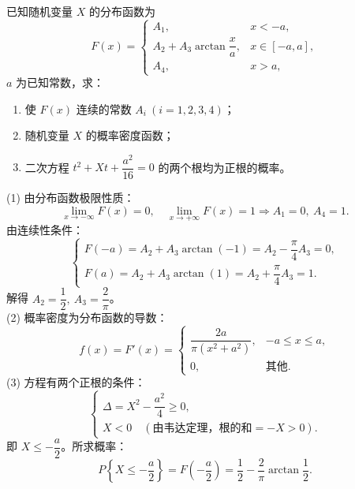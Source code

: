 \documentclass[lang=cn,11pt]{elegantbook}
\begin{document}
\begin{exercise}[反正切分布函数]
已知随机变量 $X$ 的分布函数为
\[
F(x)=
\begin{cases}
A_1, & x<-a, \\[4pt]
A_2+A_3\arctan\dfrac{x}{a}, & x\in[-a,a], \\[6pt]
A_4, & x>a,
\end{cases}
\]
$a$ 为已知常数，求：
\begin{enumerate}
    \item[(1)] 使 $F(x)$ 连续的常数 $A_i\ (i=1,2,3,4)$；
    \item[(2)] 随机变量 $X$ 的概率密度函数；
    \item[(3)] 二次方程 $t^2+Xt+\dfrac{a^2}{16}=0$ 的两个根均为正根的概率。
\end{enumerate}
\end{exercise}
\begin{solution}
(1) 由分布函数极限性质：
\[
\lim_{x\to-\infty}F(x)=0,\quad \lim_{x\to+\infty}F(x)=1 \Rightarrow A_1=0,\ A_4=1.
\]
由连续性条件：
\[
\begin{cases}
F(-a)=A_2+A_3\arctan(-1)=A_2-\dfrac{\pi}{4}A_3=0, \\[6pt]
F(a)=A_2+A_3\arctan(1)=A_2+\dfrac{\pi}{4}A_3=1.
\end{cases}
\]
解得 $A_2=\dfrac{1}{2},\ A_3=\dfrac{2}{\pi}$。\\
(2) 概率密度为分布函数的导数：
\[
f(x)=F'(x)=
\begin{cases}
\dfrac{2a}{\pi(x^2+a^2)}, & -a\leqslant x\leqslant a, \\[6pt]
0, & \text{其他}.
\end{cases}
\]
(3) 方程有两个正根的条件：
\[
\begin{cases}
\Delta=X^2-\dfrac{a^2}{4}\geqslant0, \\[4pt]
X<0 \quad (\text{由韦达定理，根的和}=-X>0).
\end{cases}
\]
即 $X\leqslant-\dfrac{a}{2}$。所求概率：
\[
P\left\{X\leqslant-\frac{a}{2}\right\}=F\left(-\frac{a}{2}\right)=\frac{1}{2}-\frac{2}{\pi}\arctan\frac{1}{2}.
\]
\end{solution}
\end{document}
